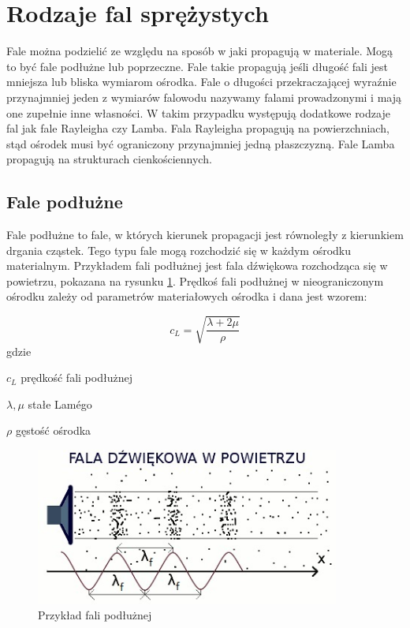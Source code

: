 
\section{Rodzaje fal sprężystych}
\label{sec:rodzaje_fal_sprezystych}

Fale można podzielić ze względu na sposób w jaki propagują w materiale. Mogą to być fale podłużne lub poprzeczne. Fale takie propagują jeśli długość fali jest mniejsza lub bliska wymiarom ośrodka. Fale o długości przekraczającej wyraźnie przynajmniej jeden z wymiarów falowodu nazywamy falami prowadzonymi i mają one zupełnie inne własności. W takim przypadku występują dodatkowe rodzaje fal jak fale Rayleigha czy Lamba. Fala Rayleigha propagują na powierzchniach, stąd ośrodek musi być ograniczony przynajmniej jedną płaszczyzną. Fale Lamba propagują na strukturach cienkościennych.

\subsection{Fale podłużne}

Fale podłużne to fale, w których kierunek propagacji jest równoległy z kierunkiem drgania cząstek. Tego typu fale mogą rozchodzić się w każdym ośrodku materialnym. Przykładem fali podłużnej jest fala dźwiękowa rozchodząca się w powietrzu, pokazana na rysunku \ref{fig:fala_podluzna}. Prędkoś fali podłużnej w nieograniczonym ośrodku zależy od parametrów materiałowych ośrodka i dana jest wzorem:

\begin{equation}
c_L=\sqrt{\frac{\lambda+2\mu}{\rho}}
\end{equation}
gdzie
\begin{eqwhere}[2cm]
        \item[$c_L$] prędkość fali podłużnej
        \item[$\lambda, \mu$] stałe Lam\'{e}go
        \item[$\rho$] gęstość ośrodka
\end{eqwhere}

\begin{figure}[h]
\centering
\includegraphics[width=10cm]{Zdjecia/2/fala_podluzna}
\caption{Przykład fali podłużnej}
\label{fig:fala_podluzna}
\end{figure}

